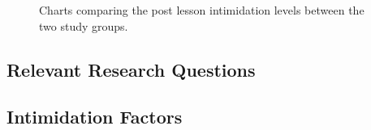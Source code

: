 \begin{figure}[htbp]
	\centering
	\scalebox{0.67}{}
	\vspace{-2em}
	\caption{Charts comparing the post lesson intimidation levels between the two study groups.}
	\label{fig:confidence}
\end{figure}

\subsection{Relevant Research Questions}
\subsection{Intimidation Factors}
